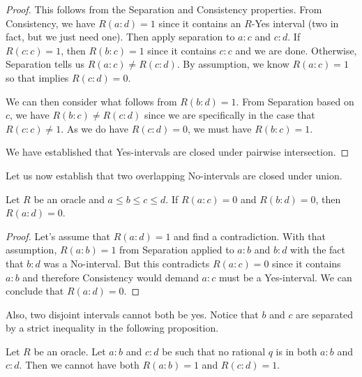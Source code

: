 \documentclass[12pt]{article}
\begin{document}
\begin{proof}
  
  This follows from the Separation and Consistency properties. From Consistency, we have $R(a:d) = 1$ since it contains an $R$-Yes interval (two in fact, but we just need one). Then apply separation to $a:c$ and $c:d$. If $R(c:c) = 1$, then $R(b:c) = 1$ since it contains $c:c$ and we are done. Otherwise, Separation tells us $R(a:c) \neq R(c:d)$. By assumption, we know $R(a:c) = 1$ so that implies $R(c:d) = 0$. 
  
  We can then consider what follows from $R(b:d) = 1$.  From Separation based on $c$, we have $R(b:c) \neq R(c:d)$ since we are specifically in the case that $R(c:c) \neq 1$. As we do have $R(c:d) = 0$, we must have $R(b:c) = 1$.
  
  We have established that Yes-intervals are closed under pairwise intersection. 
\end{proof}


Let us now establish that two overlapping No-intervals are closed under union. 

\begin{proposition}\label{pr:union}
Let $R$ be an oracle and $a \leq b \leq c \leq d$.  If $R(a:c) = 0$ and $R(b:d) = 0$, then $R(a:d) = 0$. 
\end{proposition}

\begin{proof}
    Let's assume that $R(a:d) = 1$ and find a contradiction. With that assumption, $R(a:b) = 1$ from Separation applied to $a:b$ and $b:d$ with the fact that $b:d$ was a No-interval. But this contradicts $R(a:c)= 0$ since it contains $a:b$ and therefore Consistency would demand $a:c$ must be a Yes-interval. We can conclude that $R(a:d) =0$.
\end{proof}

Also, two disjoint intervals cannot both be yes. Notice that $b$ and $c$ are separated by a strict inequality in the following proposition. 

\begin{proposition} \label{pr:disjoint}
Let $R$ be an oracle. Let $a:b$ and $c:d$ be such that no rational $q$ is in both $a:b$ and $c:d$. Then we cannot have both $R(a:b) = 1$ and $R(c:d) = 1$. 
\end{proposition}
\end{document}
